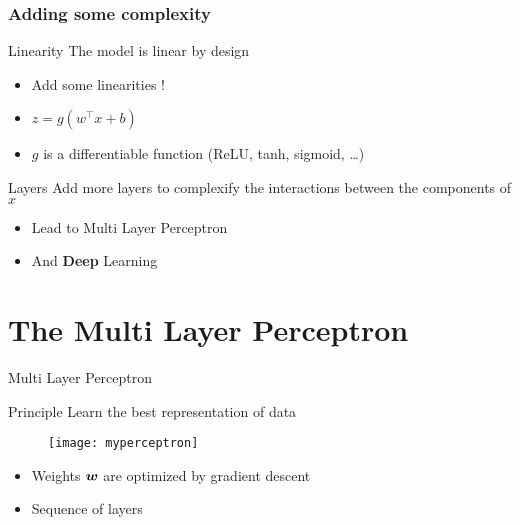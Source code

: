 \documentclass[11pt]{beamer}
\begin{document}
\begin{frame}
  \frametitle{Adding some complexity}
  \begin{block}{Linearity}
    The model is linear by design
    \begin{itemize}
    \item Add some linearities !
    \item $z = g(w^\top x + b)$
    \item $g$ is a differentiable function (ReLU, tanh, sigmoid, \dots)
    \end{itemize}
  \end{block}
  \begin{block}{Layers}
    Add more layers to complexify the interactions between the components of $x$
    \begin{itemize}
    \item Lead to Multi Layer Perceptron
    \item And \textbf{Deep} Learning
    \end{itemize}
  \end{block}
\end{frame} 

\section{The Multi Layer Perceptron}
\label{sec:mlp}

\begin{frame}{Multi Layer Perceptron}
  \begin{block}{Principle}
    Learn the best representation of data
    \vfill
    
\begin{figure}
  \centering
      \texttt{[image: myperceptron]}
\end{figure}
   
    \vfill
      \begin{itemize}
      \item Weights ${\boldsymbol{w}}$ are optimized by gradient descent
      \item Sequence of layers
      \end{itemize}
    \end{block}
\end{frame}
\end{document}
